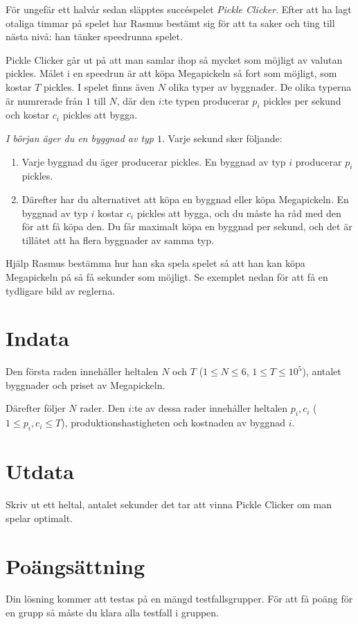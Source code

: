 \noindent

För ungefär ett halvår sedan släpptes succéspelet \emph{Pickle Clicker}. 
Efter att ha lagt otaliga timmar på spelet har Rasmus bestämt sig för att ta 
saker och ting till nästa nivå: han tänker speedrunna spelet. 

Pickle Clicker går ut på att man samlar ihop så mycket som möjligt av valutan pickles. 
Målet i en speedrun är att köpa Megapickeln så fort som möjligt, som kostar $T$ pickles. 
I spelet finns även $N$ olika typer av byggnader. De olika typerna är numrerade från 
$1$ till $N$, där den $i$:te typen producerar $p_i$ pickles per sekund och kostar 
$c_i$ pickles att bygga.

\textit{I början äger du en byggnad av typ $1$}. Varje sekund sker följande: 
\begin{enumerate}
  \item Varje byggnad du äger producerar pickles. En byggnad av typ $i$ producerar $p_i$ pickles.
  \item Därefter har du alternativet att köpa en byggnad eller köpa Megapickeln. En byggnad av typ $i$ kostar 
  $c_i$ pickles att bygga, och du måste ha råd med den för att få köpa den. Du får maximalt köpa en byggnad 
  per sekund, och det är tillåtet att ha flera byggnader av samma typ.
\end{enumerate}

Hjälp Rasmus bestämma hur han ska spela spelet så att han kan köpa Megapickeln på så få sekunder som möjligt.
Se exemplet nedan för att få en tydligare bild av reglerna.

\section*{Indata}
Den första raden innehåller heltalen $N$ och $T$ ($1 \le N \le 6$, $1 \leq T \leq 10^5$),
antalet byggnader och priset av Megapickeln.

Därefter följer $N$ rader. Den $i$:te av dessa rader innehåller heltalen $p_i, c_i$
($1 \leq p_i,c_i \leq T$), produktionshastigheten och kostnaden av byggnad $i$.

\section*{Utdata}
Skriv ut ett heltal, antalet sekunder det tar att vinna Pickle Clicker om man spelar optimalt.

\section*{Poängsättning}
Din lösning kommer att testas på en mängd testfallsgrupper.
För att få poäng för en grupp så måste du klara alla testfall i gruppen.

